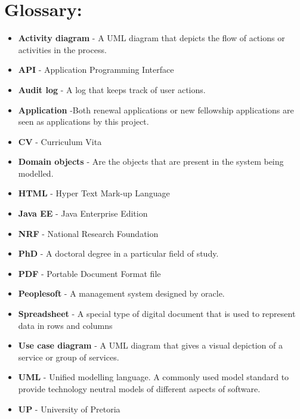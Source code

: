 \documentclass[12pt]{article}
\begin{document}
\newpage

\section{Glossary:}
\vspace{0.2in}

\begin{itemize}
\item \textbf{Activity diagram} - A UML diagram that depicts the flow of actions or activities in the process.
\item \textbf{API} - Application Programming Interface
\item \textbf{Audit log} - A log that keeps track of user actions.
\item \textbf{Application} -Both renewal applications or new fellowship applications are seen as applications by this project.
\item \textbf{CV} - Curriculum Vita
\item \textbf{Domain objects} - Are the objects that are present in the system being modelled.
\item \textbf{HTML} - Hyper Text Mark-up Language
\item \textbf{Java EE} - Java Enterprise Edition
\item \textbf{NRF} - National Research Foundation
\item \textbf{PhD} - A doctoral degree in a particular field of study.
\item \textbf{PDF} - Portable Document Format file
\item \textbf{Peoplesoft} - A management system designed by oracle. 
\item \textbf{Spreadsheet} - A special type of digital document that is used to represent data in rows and columns
\item \textbf{Use case diagram} - A UML diagram that gives a visual depiction of a service or group of services.
\item \textbf{UML} - Unified modelling language. A commonly used model standard to provide technology neutral models of different aspects of software.
\item \textbf{UP} - University of Pretoria
 


\end{itemize}	
\end{document}

